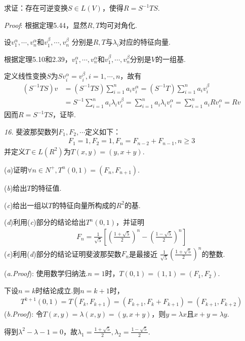 求证：存在可逆变换$S \in L(V)$，使得$R=S^{-1}TS$.

\textit{Proof}:
根据定理5.44，显然$R,T$均可对角化.

设$v_1^\alpha,\cdots,v_n^\alpha$和$v_1^\beta,\cdots,v_n^\beta$
分别是$R,T$与$\lambda_i$对应的特征向量.

根据定理5.10和2.39，$v_1^\alpha,\cdots,v_n^\alpha$和$v_1^\beta,\cdots,v_n^\beta$分别是$V$的一组基.

定义线性变换$S$为$Sv_i^\alpha=v_i^\beta,i=1,\cdots,n$，故有
    \begin{align*}
        (S^{-1}TS)v &=(S^{-1}TS)\sum_{i=1}^n a_iv_i^\alpha=(S^{-1}T)\sum_{i=1}^n a_iv_i^\beta \\
                    &=S^{-1}\sum_{i=1}^n a_i\lambda_i v_i^\beta=\sum_{i=1}^n a_i\lambda_i v_i^\alpha
                     =\sum_{i=1}^n a_iRv_i^\alpha=Rv
    \end{align*}
因而$R=S^{-1}TS$，证毕.

\newpage

\textit{16.}
{\kaishu 斐波那契数列}$F_1,F_2,\cdots$定义如下：
    \begin{align*}
        F_1=1,F_2=1,F_n=F_{n-2}+F_{n-1},n \geq 3
    \end{align*}
并定义$T \in L(R^2)$为$T(x,y)=(y,x+y)$.

(\textit{a})证明$\forall n \in N^+,T^n(0,1)=(F_n,F_{n+1})$.

(\textit{b})给出$T$的特征值.

(\textit{c})给出一组以$T$的特征向量所构成的$R^2$的基.

(\textit{d})利用(\textit{c})部分的结论给出$T^n(0,1)$，并证明
    \begin{align*}
        F_n=\frac{1}{\sqrt{5}}[(\frac{1+\sqrt{5}}{2})^n-(\frac{1-\sqrt{5}}{2})^n]
    \end{align*}
(\textit{e})利用(\textit{d})部分的结论证明{\kaishu 斐波那契数}$F_n$是最接近
$\frac{1}{\sqrt{5}}(\frac{1+\sqrt{5}}{2})^n$的整数.

(\textit{a.Proof}):
使用数学归纳法.$n=1$时，$T(0,1)=(1,1)=(F_1,F_2)$.

下设$n=k$时结论成立.则$n=k+1$时，
    \begin{align*}
        T^{k+1}(0,1)=T(F_k,F_{k+1})=(F_{k+1},F_k+F_{k+1})=(F_{k+1},F_{k+2})
    \end{align*}
(\textit{b.Proof}):
令$T(x,y)=\lambda(x,y)=(y,x+y)$，则$y=\lambda x$且$x+y=\lambda y$.

得到$\lambda^2-\lambda-1=0$，故$\lambda_1=\frac{1+\sqrt{5}}{2},\lambda_2=\frac{1-\sqrt{5}}{2}$.

